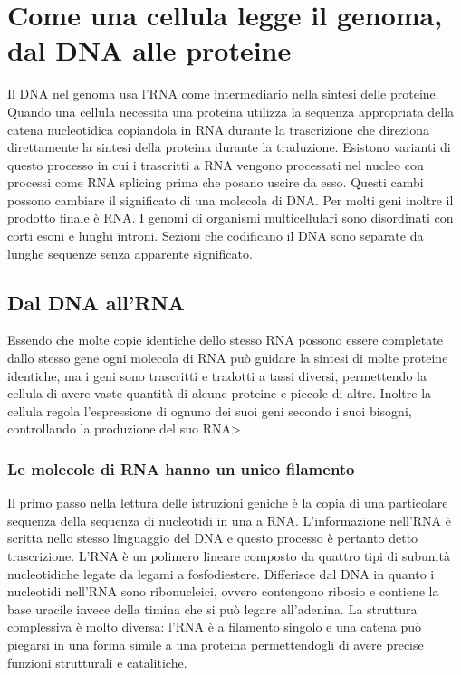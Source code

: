 \chapter{Come una cellula legge il genoma, dal DNA alle proteine}
Il DNA nel genoma usa l'RNA come intermediario nella sintesi delle proteine. Quando una cellula necessita una proteina utilizza la sequenza appropriata della catena nucleotidica 
copiandola in RNA durante la trascrizione che direziona direttamente la sintesi della proteina durante la traduzione. Esistono varianti di questo processo in cui i trascritti a RNA 
vengono processati nel nucleo con processi come RNA splicing prima che posano uscire da esso. Questi cambi possono cambiare il significato di una molecola di DNA. Per molti geni inoltre
il prodotto finale \`e RNA. I genomi di organismi multicellulari sono disordinati con corti esoni e lunghi introni. Sezioni che codificano il DNA sono separate da lunghe sequenze senza 
apparente significato. 
\section{Dal DNA all'RNA}
Essendo che molte copie identiche dello stesso RNA possono essere completate dallo stesso gene ogni molecola di RNA pu\`o guidare la sintesi di molte proteine identiche, ma i geni sono
trascritti e tradotti a tassi diversi, permettendo la cellula di avere vaste quantit\`a di alcune proteine e piccole di altre. Inoltre la cellula regola l'espressione di ognuno dei suoi
geni secondo i suoi bisogni, controllando la produzione del suo RNA>
\subsection{Le molecole di RNA hanno un unico filamento}
Il primo passo nella lettura delle istruzioni geniche \`e la copia di una particolare sequenza della sequenza di nucleotidi in una a RNA. L'informazione nell'RNA \`e scritta nello stesso
linguaggio del DNA e questo processo \`e pertanto detto trascrizione. L'RNA \`e un polimero lineare composto da quattro tipi di subunit\`a nucleotidiche legate da legami a fosfodiestere.
Differisce dal DNA in quanto i nucleotidi nell'RNA sono ribonucleici, ovvero contengono ribosio e contiene la base uracile invece della timina che si pu\`o legare all'adenina. La
struttura complessiva \`e molto diversa: l'RNA \`e a filamento singolo e una catena pu\`o piegarsi in una forma simile a una proteina permettendogli di avere precise funzioni strutturali
e catalitiche.
